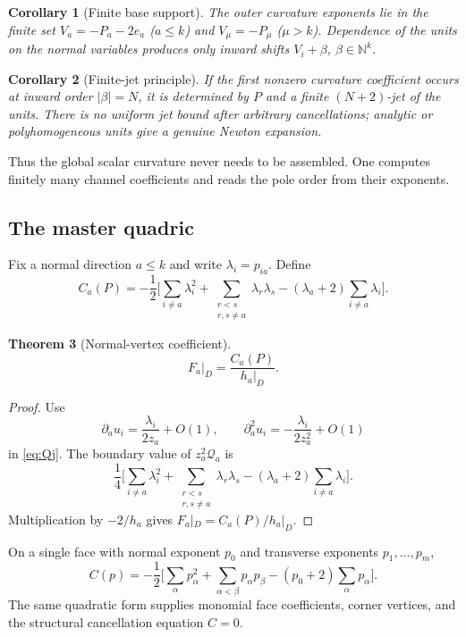 \documentclass[11pt,a4paper]{article}
\newtheorem{theorem}{Theorem}[section]
\newtheorem{corollary}[theorem]{Corollary}
\theoremstyle{definition}
\theoremstyle{remark}
\newcommand{\NN}{\mathbb{N}}
\begin{document}
\begin{corollary}[Finite base support]
\label{cor:basesupport}
The outer curvature exponents lie in the finite set
\(V_a=-P_a-2e_a\) (\(a\le k\)) and \(V_\mu=-P_\mu\) (\(\mu>k\)). Dependence of
the units on the normal variables produces only inward shifts
\(V_i+\beta\), \(\beta\in\NN^k\).
\end{corollary}

\begin{corollary}[Finite-jet principle]
\label{cor:finitejet}
If the first nonzero curvature coefficient occurs at inward order \(|\beta|=N\),
it is determined by \(P\) and a finite \((N+2)\)-jet of the units. There is no
uniform jet bound after arbitrary cancellations; analytic or polyhomogeneous
units give a genuine Newton expansion.
\end{corollary}

Thus the global scalar curvature never needs to be assembled. One computes
finitely many channel coefficients and reads the pole order from their
exponents.

\subsection{The master quadric}

Fix a normal direction \(a\le k\) and write \(\lambda_i=p_{ia}\). Define
\begin{equation}
\boxed{
C_a(P)
=
-\frac12
\Biggl[
\sum_{i\neq a}\lambda_i^2
+
\sum_{\substack{r<s\\r,s\neq a}}\lambda_r\lambda_s
-(\lambda_a+2)\sum_{i\neq a}\lambda_i
\Biggr].
}
\label{eq:Ca}
\end{equation}

\begin{theorem}[Normal-vertex coefficient]
\label{thm:master}
\[
F_a\big|_D=\frac{C_a(P)}{h_a\big|_D}.
\]
\end{theorem}

\begin{proof}
Use
\[
\partial_au_i=\frac{\lambda_i}{2z_a}+O(1),
\qquad
\partial_a^2u_i=-\frac{\lambda_i}{2z_a^2}+O(1)
\]
in \eqref{eq:Qj}. The boundary value of \(z_a^2\mathcal Q_a\) is
\[
\frac14
\Biggl[
\sum_{i\neq a}\lambda_i^2
+
\sum_{\substack{r<s\\r,s\neq a}}\lambda_r\lambda_s
-(\lambda_a+2)\sum_{i\neq a}\lambda_i
\Biggr].
\]
Multiplication by \(-2/h_a\) gives \(F_a|_D=C_a(P)/h_a|_D\).
\end{proof}

On a single face with normal exponent \(p_0\) and transverse exponents
\(p_1,\ldots,p_m\),
\begin{equation}
C(p)
=
-\frac12
\Biggl[
\sum_\alpha p_\alpha^2
+\sum_{\alpha<\beta}p_\alpha p_\beta
-(p_0+2)\sum_\alpha p_\alpha
\Biggr].
\label{eq:Cface}
\end{equation}
The same quadratic form supplies monomial face coefficients, corner vertices,
and the structural cancellation equation \(C=0\).
\end{document}
